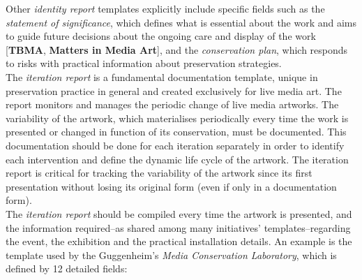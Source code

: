 Other \textit{identity report} templates explicitly include specific fields such as the \textit{statement of significance}, which defines what is essential about the work and aims to guide future decisions about the ongoing care and display of the work [\textbf{TBMA}, \textbf{Matters in Media Art}], and the \textit{conservation plan}, which responds to risks with practical information about preservation strategies. \\
\newline
The \textit{iteration report} is a fundamental documentation template, unique in preservation practice in general and created exclusively for live media art. The report monitors and manages the periodic change of live media artworks. The variability of the artwork, which materialises periodically every time the work is presented or changed in function of its conservation, must be documented. This documentation should be done for each iteration separately \cite{phillips2015reporting} in order to identify each intervention and define the dynamic life cycle of the artwork. The iteration report is critical for tracking the variability of the artwork since its first presentation without losing its original form (even if only in a documentation form).\\
The \textit{iteration report} should be compiled every time the artwork is presented, and the information required–as shared among many initiatives’ templates–regarding the event, the exhibition and the practical installation details. An example is the template used by the Guggenheim’s \textit{Media Conservation Laboratory}, which is defined by 12 detailed fields:

